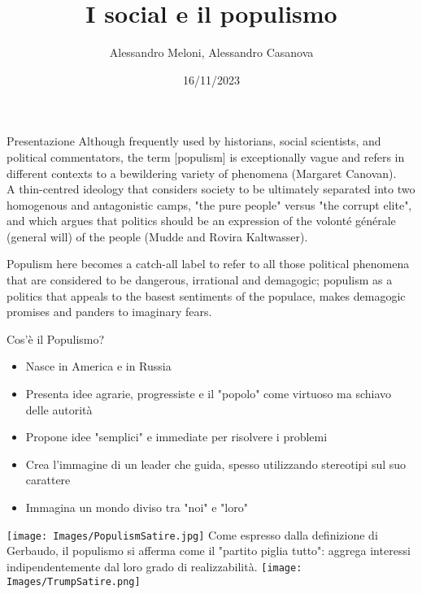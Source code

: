 \documentclass{beamer}
\title{I social e il populismo}
\author{Alessandro Meloni, Alessandro Casanova}
\date{16/11/2023}
\begin{document}
\maketitle
 
\begin{frame}{Presentazione}
    \centering
    Although frequently used by historians, social scientists, and political commentators, the term [populism] is exceptionally vague and refers in different contexts to a bewildering variety of phenomena (Margaret Canovan).\\
    A thin-centred ideology that considers society to be ultimately separated into two homogenous and antagonistic camps, "the pure people" versus "the corrupt elite", and which argues that politics should be an expression of the volonté générale (general will) of the people (Mudde and Rovira Kaltwasser).
\end{frame}
\begin{frame}
    Populism here becomes a catch-all label to refer to all those political phenomena that are considered to be dangerous, irrational and demagogic; populism as a politics that appeals to the basest sentiments of the populace, makes demagogic promises and panders to imaginary fears.
    \citep{Gerbaudo2018}

\end{frame}
\begin{frame}{Cos'è il Populismo?}
\begin{itemize}
    \item Nasce in America e in Russia
    \item Presenta idee agrarie, progressiste e il "popolo" come virtuoso ma schiavo delle autorità
    \item Propone idee "semplici" e immediate per risolvere i problemi
    \item Crea l'immagine di un leader che guida, spesso utilizzando stereotipi sul suo carattere
    \item Immagina un mondo diviso tra "noi" e "loro"
\end{itemize}
\end{frame}

\begin{frame}
    \flushleft
    \texttt{[image: Images/PopulismSatire.jpg]}
    \label{F:satirapopulismo}
Come espresso dalla definizione di Gerbaudo, il populismo si afferma come il "partito piglia tutto": aggrega interessi indipendentemente dal loro grado di realizzabilità.
    \flushright
    \texttt{[image: Images/TrumpSatire.png]}
    \label{F:satiratrump}
\end{frame}
\end{document}
